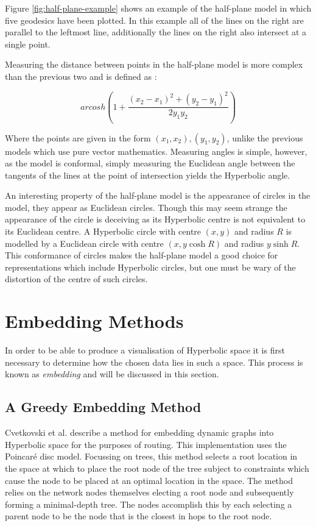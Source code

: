 Figure \ref{fig:half-plane-example} shows an example of the half-plane model in which five geodesics have been plotted. In this example all of the lines on the right are parallel to the leftmost line, additionally the lines on the right also intersect at a single point.

Measuring the distance between points in the half-plane model is more complex than the previous two and is defined as \cite{kubo_geometry_1988}:

\begin{equation}
\label{half_plane_distance}
arcosh\left(1+\frac{(x_2-x_1)^2+(y_2-y_1)^2}{2y_1y_2}\right)
\end{equation}

Where the points are given in the form $(x_1, x_2), (y_1, y_2)$, unlike the previous models which use pure vector mathematics. Measuring angles is simple, however, as the model is conformal, simply measuring the Euclidean angle between the tangents of the lines at the point of intersection yields the Hyperbolic angle.

An interesting property of the half-plane model is the appearance of circles in the model, they appear as Euclidean circles. Though this may seem strange the appearance of the circle is deceiving as its Hyperbolic centre is not equivalent to its Euclidean centre. A Hyperbolic circle with centre $(x,y)$ and radius $R$ is modelled by a Euclidean circle with centre $(x, y \cosh R)$ and radius $y \sinh R$. This conformance of circles makes the half-plane model a good choice for representations which include Hyperbolic circles, but one must be wary of the distortion of the centre of such circles.

\section{Embedding Methods}
In order to be able to produce a visualisation of Hyperbolic space it is first necessary to determine how the chosen data lies in such a space. This process is known as \textit{embedding} and will be discussed in this section.

\subsection{A Greedy Embedding Method}

Cvetkovski et al. \cite{cvetkovski_hyperbolic_2009} describe a method for embedding dynamic graphs into Hyperbolic space for the purposes of routing. This implementation uses the Poincar\'{e} disc model. Focussing on trees, this method selects a root location in the space at which to place the root node of the tree subject to constraints which cause the node to be placed at an optimal location in the space. The method relies on the network nodes themselves electing a root node and subsequently forming a minimal-depth tree. The nodes accomplish this by each selecting a parent node to be the node that is the closest in hops to the root node. 

